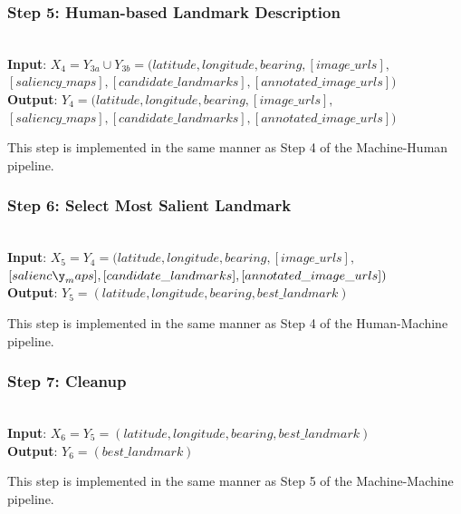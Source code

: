 \subsubsection*{Step 5: Human-based Landmark Description}~\\
\noindent\textbf{Input}: $X_4 = Y_{3a} \cup Y_{3b} = (latitude, longitude, bearing, [image\_urls],$\\$ [saliency\_maps], [candidate\_landmarks], [annotated\_image\_urls])$ \\
\textbf{Output}: $Y_4 = (latitude, longitude, bearing, [image\_urls], $\\$[saliency\_maps], [candidate\_landmarks], [annotated\_image\_urls])$ 

This step is implemented in the same manner as Step 4 of the Machine-Human pipeline.

\subsubsection*{Step 6: Select Most Salient Landmark}~\\
\noindent\textbf{Input}: $X_5 = Y_4 = (latitude, longitude, bearing,  [image\_urls],$\\$ [salienc\y_maps], [candidate\_landmarks], [annotated\_image\_urls] )$\\
\textbf{Output}: $Y_5 = (latitude, longitude, bearing, best\_landmark)$
 
This step is implemented in the same manner as Step 4 of the Human-Machine pipeline.

\subsubsection*{Step 7: Cleanup}~\\
\noindent\textbf{Input}: $X_6 = Y_5 = (latitude, longitude, bearing, best\_landmark)$\\
\textbf{Output}: $Y_6 = (best\_landmark)$

This step is implemented in the same manner as Step 5 of the Machine-Machine pipeline.



